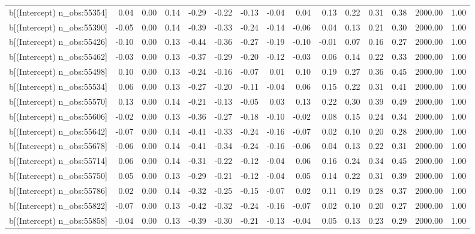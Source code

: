 \begin{table}[ht]
\begin{tabular}{rrrrrrrrrrrrrrr}
  b[(Intercept) n\_obs:55354] & 0.04 & 0.00 & 0.14 & -0.29 & -0.22 & -0.13 & -0.04 & 0.04 & 0.13 & 0.22 & 0.31 & 0.38 & 2000.00 & 1.00 \\ 
  b[(Intercept) n\_obs:55390] & -0.05 & 0.00 & 0.14 & -0.39 & -0.33 & -0.24 & -0.14 & -0.06 & 0.04 & 0.13 & 0.21 & 0.30 & 2000.00 & 1.00 \\ 
  b[(Intercept) n\_obs:55426] & -0.10 & 0.00 & 0.13 & -0.44 & -0.36 & -0.27 & -0.19 & -0.10 & -0.01 & 0.07 & 0.16 & 0.27 & 2000.00 & 1.00 \\ 
  b[(Intercept) n\_obs:55462] & -0.03 & 0.00 & 0.13 & -0.37 & -0.29 & -0.20 & -0.12 & -0.03 & 0.06 & 0.14 & 0.22 & 0.33 & 2000.00 & 1.00 \\ 
  b[(Intercept) n\_obs:55498] & 0.10 & 0.00 & 0.13 & -0.24 & -0.16 & -0.07 & 0.01 & 0.10 & 0.19 & 0.27 & 0.36 & 0.45 & 2000.00 & 1.00 \\ 
  b[(Intercept) n\_obs:55534] & 0.06 & 0.00 & 0.13 & -0.27 & -0.20 & -0.11 & -0.04 & 0.06 & 0.15 & 0.22 & 0.31 & 0.41 & 2000.00 & 1.00 \\ 
  b[(Intercept) n\_obs:55570] & 0.13 & 0.00 & 0.14 & -0.21 & -0.13 & -0.05 & 0.03 & 0.13 & 0.22 & 0.30 & 0.39 & 0.49 & 2000.00 & 1.00 \\ 
  b[(Intercept) n\_obs:55606] & -0.02 & 0.00 & 0.13 & -0.36 & -0.27 & -0.18 & -0.10 & -0.02 & 0.08 & 0.15 & 0.24 & 0.34 & 2000.00 & 1.00 \\ 
  b[(Intercept) n\_obs:55642] & -0.07 & 0.00 & 0.14 & -0.41 & -0.33 & -0.24 & -0.16 & -0.07 & 0.02 & 0.10 & 0.20 & 0.28 & 2000.00 & 1.00 \\ 
  b[(Intercept) n\_obs:55678] & -0.06 & 0.00 & 0.14 & -0.41 & -0.34 & -0.24 & -0.16 & -0.06 & 0.04 & 0.13 & 0.22 & 0.31 & 2000.00 & 1.00 \\ 
  b[(Intercept) n\_obs:55714] & 0.06 & 0.00 & 0.14 & -0.31 & -0.22 & -0.12 & -0.04 & 0.06 & 0.16 & 0.24 & 0.34 & 0.45 & 2000.00 & 1.00 \\ 
  b[(Intercept) n\_obs:55750] & 0.05 & 0.00 & 0.13 & -0.29 & -0.21 & -0.12 & -0.04 & 0.05 & 0.14 & 0.22 & 0.31 & 0.39 & 2000.00 & 1.00 \\ 
  b[(Intercept) n\_obs:55786] & 0.02 & 0.00 & 0.14 & -0.32 & -0.25 & -0.15 & -0.07 & 0.02 & 0.11 & 0.19 & 0.28 & 0.37 & 2000.00 & 1.00 \\ 
  b[(Intercept) n\_obs:55822] & -0.07 & 0.00 & 0.13 & -0.42 & -0.32 & -0.24 & -0.16 & -0.07 & 0.02 & 0.10 & 0.20 & 0.27 & 2000.00 & 1.00 \\ 
  b[(Intercept) n\_obs:55858] & -0.04 & 0.00 & 0.13 & -0.39 & -0.30 & -0.21 & -0.13 & -0.04 & 0.05 & 0.13 & 0.23 & 0.29 & 2000.00 & 1.00 \\ 

\end{tabular}
\end{table}

